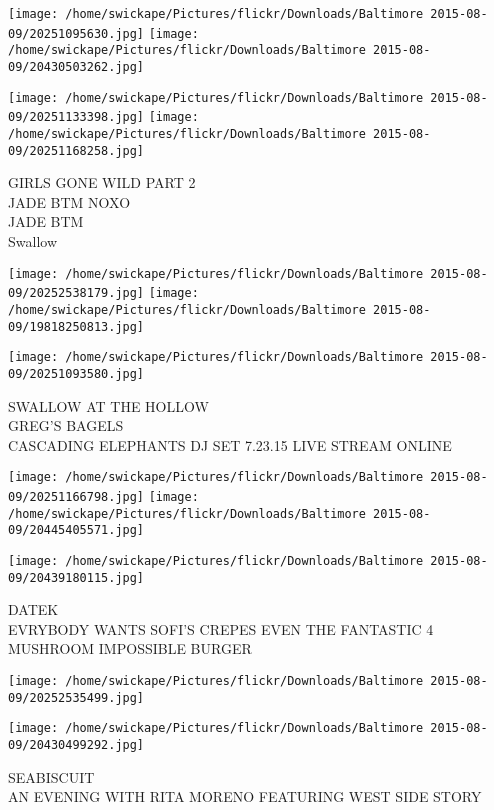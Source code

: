 \documentclass[10pt,letterpaper]{article}
\begin{document}
\texttt{[image: /home/swickape/Pictures/flickr/Downloads/Baltimore 2015-08-09/20251095630.jpg]}
\texttt{[image: /home/swickape/Pictures/flickr/Downloads/Baltimore 2015-08-09/20430503262.jpg]}

\texttt{[image: /home/swickape/Pictures/flickr/Downloads/Baltimore 2015-08-09/20251133398.jpg]}
\texttt{[image: /home/swickape/Pictures/flickr/Downloads/Baltimore 2015-08-09/20251168258.jpg]}

GIRLS GONE WILD PART 2\\
JADE BTM NOXO\\
JADE BTM\\
Swallow\\
\pagebreak

\texttt{[image: /home/swickape/Pictures/flickr/Downloads/Baltimore 2015-08-09/20252538179.jpg]}
\texttt{[image: /home/swickape/Pictures/flickr/Downloads/Baltimore 2015-08-09/19818250813.jpg]}

\vspace{0.25in}
\texttt{[image: /home/swickape/Pictures/flickr/Downloads/Baltimore 2015-08-09/20251093580.jpg]}

SWALLOW AT THE HOLLOW\\
GREG'S BAGELS\\
CASCADING ELEPHANTS DJ SET 7.23.15 LIVE STREAM ONLINE\\
\pagebreak

\texttt{[image: /home/swickape/Pictures/flickr/Downloads/Baltimore 2015-08-09/20251166798.jpg]}
\texttt{[image: /home/swickape/Pictures/flickr/Downloads/Baltimore 2015-08-09/20445405571.jpg]}

\texttt{[image: /home/swickape/Pictures/flickr/Downloads/Baltimore 2015-08-09/20439180115.jpg]}

DATEK\\
EVRYBODY WANTS SOFI'S CREPES EVEN THE FANTASTIC 4\\
MUSHROOM IMPOSSIBLE BURGER\\
\pagebreak

\texttt{[image: /home/swickape/Pictures/flickr/Downloads/Baltimore 2015-08-09/20252535499.jpg]}

\vspace{0.25in}
\texttt{[image: /home/swickape/Pictures/flickr/Downloads/Baltimore 2015-08-09/20430499292.jpg]}

SEABISCUIT\\
AN EVENING WITH RITA MORENO FEATURING WEST SIDE STORY\\
\pagebreak
\end{document}
